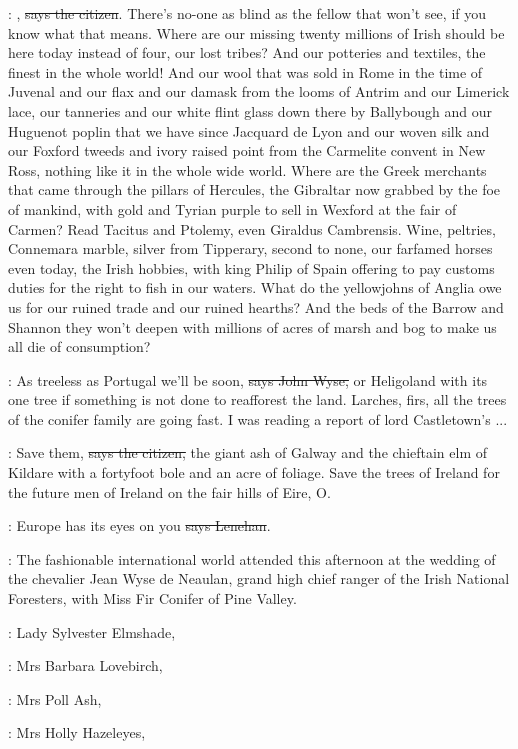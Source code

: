 \citizen:
, \sout{says the citizen}.
There's no-one as blind as the fellow that
won't see, if you know what that means. Where are our missing
twenty millions of Irish should be here today instead of four,
our lost tribes? And our potteries and textiles, the finest in
the whole world! And our wool that was sold in Rome in the time
of Juvenal and our flax and our damask from the looms of Antrim
and our Limerick lace, our tanneries and our white flint glass
down there by Ballybough and our Huguenot poplin that we have since
Jacquard de Lyon and our woven silk and our Foxford tweeds and ivory
raised point from the Carmelite convent in New Ross, nothing like it in
the whole wide world. Where are the Greek merchants that came through the
pillars of Hercules, the Gibraltar now grabbed by the foe of mankind, with
gold and Tyrian purple to sell in Wexford at the fair of Carmen? Read
Tacitus and Ptolemy, even Giraldus Cambrensis. Wine, peltries,
Connemara marble, silver from Tipperary, second to none, our farfamed
horses even today, the Irish hobbies, with king Philip of Spain offering
to pay customs duties for the right to fish in our waters. What do the
yellowjohns of Anglia owe us for our ruined trade and our ruined hearths?
And the beds of the Barrow and Shannon they won't deepen with millions
of acres of marsh and bog to make us all die of consumption?

\johnwyse:
As treeless as Portugal we'll be soon,
\sout{says John Wyse,} or Heligoland
with its one tree if something is not done to reafforest the land.
Larches, firs, all the trees of the conifer family are going fast. I was
reading a report of lord Castletown's ...

\citizen:
Save them, \sout{says the citizen,}
the giant ash of Galway and the chieftain
elm of Kildare with a fortyfoot bole and an acre of foliage. Save the
trees of Ireland for the future men of Ireland on the fair hills of
Eire, O.

\lenehan:
Europe has its eyes on you \sout{says Lenehan}.

:
The fashionable international world attended
 this afternoon
at the wedding of the chevalier Jean Wyse de Neaulan, grand high chief
ranger of the Irish National Foresters,
with Miss Fir Conifer of Pine Valley.

:
Lady Sylvester Elmshade,

:
Mrs Barbara Lovebirch, 

:
Mrs Poll Ash, 

:
Mrs Holly Hazeleyes, 

